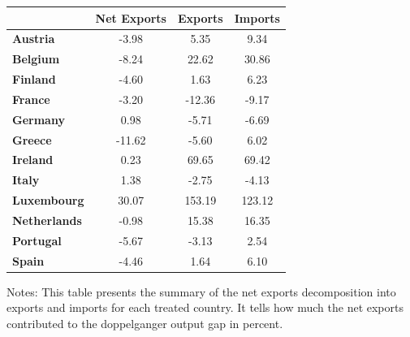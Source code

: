 \documentclass[12pt]{article}
\newcommand{\annote}[1]{\parbox{\textwidth}{\renewcommand{\baselinestretch}{1.0}\vspace{12pt} \small Notes: #1}}
\begin{document}
\begin{appendices}
\begin{table}[h!]
\begin{tabular}{l|c|cc}
        & \textbf{Net Exports}  & \textbf{Exports}  & \textbf{Imports}  \\  \midrule
\textbf{Austria} &     -3.98 &      5.35 &      9.34 \\  
[1em]
\textbf{Belgium} &     -8.24 &     22.62 &     30.86 \\   
[1em]
\textbf{Finland} &     -4.60 &      1.63 &      6.23 \\ 
[1em]
\textbf{France} &     -3.20 &    -12.36 &     -9.17 \\
[1em]
\textbf{Germany} &      0.98 &     -5.71 &     -6.69 \\  
[1em]
\textbf{Greece} &    -11.62 &     -5.60 &      6.02 \\
[1em]
\textbf{Ireland} &      0.23 &     69.65 &     69.42 \\
[1em]
\textbf{Italy} &      1.38 &     -2.75 &     -4.13 \\  
[1em]
\textbf{Luxembourg} &     30.07 &    153.19 &    123.12 \\ 
[1em]
\textbf{Netherlands} &     -0.98 &     15.38 &     16.35 \\   
[1em]
\textbf{Portugal} &     -5.67 &     -3.13 &      2.54 \\  
[1em]
\textbf{Spain} &     -4.46 &      1.64 &      6.10 \\
\bottomrule
\end{tabular}
\annote{This table presents the summary of the net exports decomposition into exports and imports for each treated country. It tells how much the net exports contributed to the doppelganger output gap in percent. }

\end{table}

\end{appendices}
\end{document}

